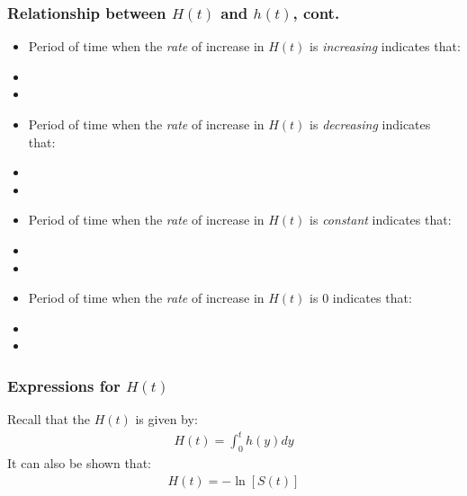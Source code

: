 %


\begin{frame}
\frametitle{Relationship between $H(t)$ and $h(t)$, cont.}
\begin{itemize}
\item Period of time when the \textit{rate} of increase in $H(t)$ is \textit{increasing} indicates that:
\item[]
\item[]
\item Period of time when the \textit{rate} of increase in $H(t)$ is \textit{decreasing} indicates that:
\item[]
\item[]
\item Period of time when the \textit{rate} of increase in $H(t)$ is \textit{constant} indicates that:
\item[]
\item[]
\item Period of time when the \textit{rate} of increase in $H(t)$ is 0 indicates that:
\item[]
\item[]
\end{itemize}
\end{frame}

\begin{frame}
\frametitle{Expressions for $H(t)$}
Recall that the $H(t)$ is given by:
\begin{eqnarray}
H(t)=\int_0^th(y)dy \nonumber
\end{eqnarray}
\vskip20pt
It can also be shown that:
\begin{eqnarray}
H(t)= -\ln[S(t)] \nonumber
\end{eqnarray}
\end{frame}

